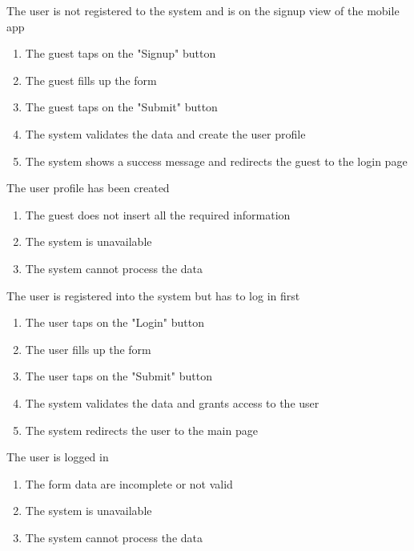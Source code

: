 \begin{enumerate}
	{The user is not registered to the system and is on the signup view of the mobile app}
	{
	\begin{enumerate}[1.]
	\item The guest taps on the "Signup" button
	\item The guest fills up the form
	\item The guest taps on the "Submit" button
	\item The system validates the data and create the user profile
	\item The system shows a success message and redirects the guest to the login page
	\end{enumerate}
	}
	{The user profile has been created}
	{
	\begin{enumerate}[1.]
	\item The guest does not insert all the required information
	\item The system is unavailable
	\item The system cannot process the data
	\end{enumerate}
	}
	
	
	{The user is registered into the system but has to log in first}
	{
	\begin{enumerate}[1.]
	\item The user taps on the "Login" button
	\item The user fills up the form
	\item The user taps on the "Submit" button
	\item The system validates the data and grants access to the user
	\item The system redirects the user to the main page
	\end{enumerate}
	}
	{The user is logged in}
	{
	\begin{enumerate}[1.]
	\item The form data are incomplete or not valid
	\item The system is unavailable
	\item The system cannot process the data
	\end{enumerate}
	}
	

\end{enumerate}
